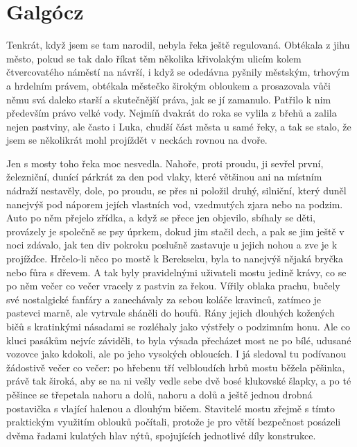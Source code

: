 \section{Galgócz}

Tenkrát, když jsem se tam narodil, nebyla řeka ještě regulovaná. Obtékala z jihu město, pokud se tak dalo říkat těm několika křivolakým ulicím kolem čtvercovatého náměstí na návrší, i když se odedávna pyšnily městským, trhovým a hrdelním právem, obtékala městečko širokým obloukem a prosazovala vůči němu svá daleko starší a skutečnější práva, jak se jí zamanulo. Patřilo k nim především právo velké vody. Nejmíň dvakrát do roka se vylila z břehů a zalila nejen pastviny, ale často i Luka, chudší část města u samé řeky, a tak se stalo, že jsem se několikrát mohl projíždět v neckách rovnou na dvoře.

Jen s mosty toho řeka moc nesvedla. Nahoře, proti proudu, ji sevřel první, železniční, dunící párkrát za den pod vlaky, které většinou ani na místním nádraží nestavěly, dole, po proudu, se přes ni položil druhý, silniční, který duněl nanejvýš pod náporem jejích vlastních vod, vzedmutých zjara nebo na podzim. Auto po něm přejelo zřídka, a když se přece jen objevilo, sbíhaly se děti, provázely je společně se psy úprkem, dokud jim stačil dech, a pak se jim ještě v noci zdávalo, jak ten div pokroku poslušně zastavuje u jejich nohou a zve je k projížďce. Hrčelo-li něco po mostě k Berekseku, byla to nanejvýš nějaká bryčka nebo fůra s dřevem. A tak byly pravidelnými uživateli mostu jedině krávy, co se po něm večer co večer vracely z pastvin za řekou. Vířily oblaka prachu, bučely své nostalgické fanfáry a zanechávaly za sebou koláče kravinců, zatímco je pastevci marně, ale vytrvale sháněli do houfů. Rány jejich dlouhých kožených bičů s kratinkými násadami se rozléhaly jako výstřely o podzimním honu. Ale co kluci pasákům nejvíc záviděli, to byla výsada přecházet most ne po bílé, udusané vozovce jako kdokoli, ale po jeho vysokých obloucích. I já sledoval tu podívanou žádostivě večer co večer: po hřebenu tří velbloudích hrbů mostu běžela pěšinka, právě tak široká, aby se na ni vešly vedle sebe dvě bosé klukovské šlapky, a po té pěšince se třepetala nahoru a dolů, nahoru a dolů a ještě jednou drobná postavička s vlající halenou a dlouhým bičem. Stavitelé mostu zřejmě s tímto praktickým využitím oblouků počítali, protože je pro větší bezpečnost posázeli dvěma řadami kulatých hlav nýtů, spojujících jednotlivé díly konstrukce. 

